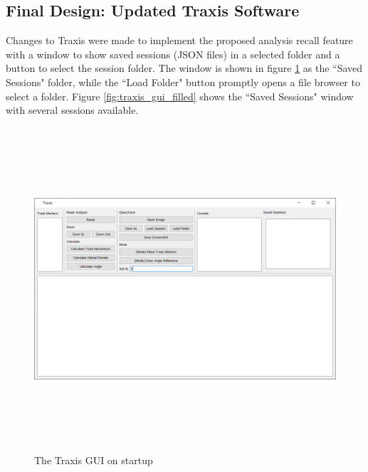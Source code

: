 \documentclass[12pt]{article} %
\begin{document}
\subsection{Final Design: Updated Traxis Software}
Changes to Traxis were made to implement the proposed analysis recall feature with a window to show saved sessions (JSON files) in a selected folder and a button to select the session folder. The window is shown in figure \ref{fig:traxis_gui} as the ``Saved Sessions" folder, while the ``Load Folder" button promptly opens a file browser to select a folder. Figure \ref{fig:traxis_gui_filled} shows the ``Saved Sessions" window with several sessions available.
\begin{figure}[htb]
    \centering
    \includegraphics[width = \linewidth, height = 12cm]{Traxis_photo.png}
    \caption{The Traxis GUI on startup}
    \label{fig:traxis_gui}
\end{figure}
\end{document}
